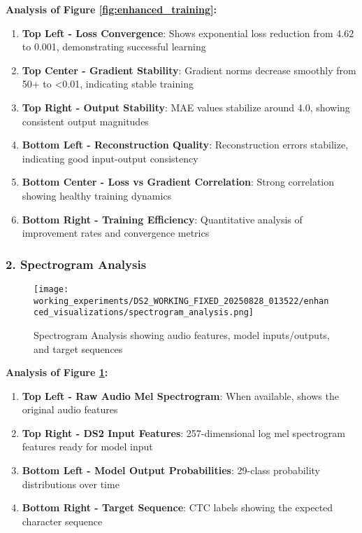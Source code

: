 \documentclass[11pt,a4paper]{article}
\begin{document}
\textbf{Analysis of Figure \ref{fig:enhanced_training}:}
\begin{enumerate}
    \item \textbf{Top Left - Loss Convergence}: Shows exponential loss reduction from 4.62 to 0.001, demonstrating successful learning
    \item \textbf{Top Center - Gradient Stability}: Gradient norms decrease smoothly from 50+ to <0.01, indicating stable training
    \item \textbf{Top Right - Output Stability}: MAE values stabilize around 4.0, showing consistent output magnitudes
    \item \textbf{Bottom Left - Reconstruction Quality}: Reconstruction errors stabilize, indicating good input-output consistency
    \item \textbf{Bottom Center - Loss vs Gradient Correlation}: Strong correlation showing healthy training dynamics
    \item \textbf{Bottom Right - Training Efficiency}: Quantitative analysis of improvement rates and convergence metrics
\end{enumerate}

\subsubsection{2. Spectrogram Analysis}
\begin{figure}[H]
\centering
\texttt{[image: working\_experiments/DS2\_WORKING\_FIXED\_20250828\_013522/enhanced\_visualizations/spectrogram\_analysis.png]}
\caption{Spectrogram Analysis showing audio features, model inputs/outputs, and target sequences}
\label{fig:spectrogram}
\end{figure}

\textbf{Analysis of Figure \ref{fig:spectrogram}:}
\begin{enumerate}
    \item \textbf{Top Left - Raw Audio Mel Spectrogram}: When available, shows the original audio features
    \item \textbf{Top Right - DS2 Input Features}: 257-dimensional log mel spectrogram features ready for model input
    \item \textbf{Bottom Left - Model Output Probabilities}: 29-class probability distributions over time
    \item \textbf{Bottom Right - Target Sequence}: CTC labels showing the expected character sequence
\end{enumerate}
\end{document}
